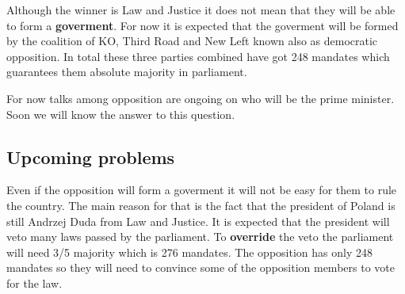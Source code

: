 \documentclass[12pt]{article}
\begin{document}
Although the winner is Law and Justice it does not mean that they will be able to form a \textbf{goverment}.
For now it is expected that the goverment will be formed by the coalition of KO, Third Road and New Left known also as democratic opposition.
In total these three parties combined have got 248 mandates which guarantees them absolute majority in parliament.

For now talks among opposition are ongoing on who will be the prime minister. Soon we will know the answer to this question.

\subsection*{Upcoming problems}

Even if the opposition will form a goverment it will not be easy for them to rule the country.
The main reason for that is the fact that the president of Poland is still Andrzej Duda from Law and Justice.
It is expected that the president will veto many laws passed by the parliament.
To \textbf{override} the veto the parliament will need 3/5 majority which is 276 mandates.
The opposition has only 248 mandates so they will need to convince some of the opposition members to vote for the law.
\end{document}
